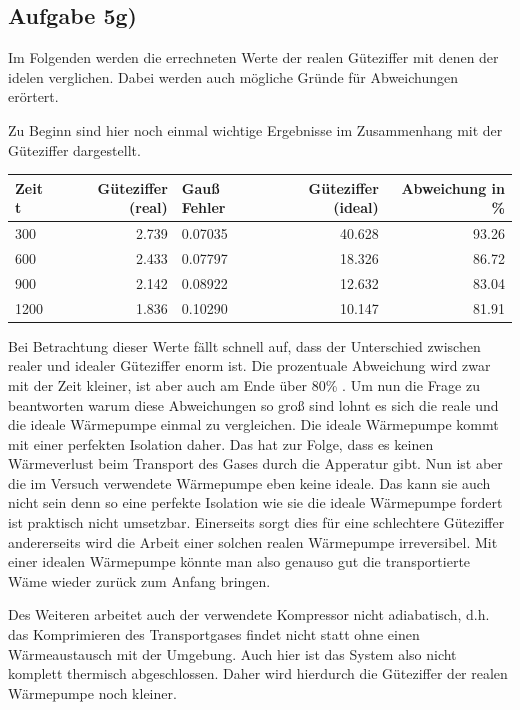 \documentclass[titlepage=firstcover, captions=tableheading]{scrartcl}
\begin{document}
\subsection{Aufgabe 5g)}

Im Folgenden werden die errechneten Werte der realen Güteziffer mit denen der idelen verglichen.
Dabei werden auch mögliche Gründe für Abweichungen erörtert. 

Zu Beginn sind hier noch einmal wichtige Ergebnisse im Zusammenhang mit der Güteziffer dargestellt.
\begin{center}
    \begin{tabular}{lr@{${}\pm{}$}lrr}
        \toprule
        {Zeit t} & { Güteziffer (real)} & {Gauß Fehler} & {Güteziffer (ideal)} & {Abweichung in \%} \\
        \midrule
        300 & 2.739 & 0.07035  & 40.628 & 93.26 \\
        600 & 2.433 & 0.07797  & 18.326 & 86.72 \\
        900 & 2.142 & 0.08922 & 12.632 & 83.04 \\
        1200 & 1.836 & 0.10290 & 10.147 & 81.91\\
        \bottomrule
        
    \end{tabular}
\end{center}

Bei Betrachtung dieser Werte fällt schnell auf, dass der Unterschied zwischen realer und idealer Güteziffer enorm ist.
Die prozentuale Abweichung wird zwar mit der Zeit kleiner, ist aber auch am Ende über 80\% .
Um nun die Frage zu beantworten warum diese Abweichungen so groß sind lohnt es sich die reale und die ideale Wärmepumpe einmal zu vergleichen.
Die ideale Wärmepumpe kommt mit einer perfekten Isolation daher. 
Das hat zur Folge, dass es keinen Wärmeverlust beim Transport des Gases durch die Apperatur gibt.
Nun ist aber die im Versuch verwendete Wärmepumpe eben keine ideale. 
Das kann sie auch nicht sein denn so eine perfekte Isolation wie sie die ideale Wärmepumpe fordert ist praktisch nicht umsetzbar.
Einerseits sorgt dies für eine schlechtere Güteziffer andererseits wird die Arbeit einer solchen realen Wärmepumpe irreversibel.
Mit einer idealen Wärmepumpe könnte man also genauso gut die transportierte Wäme wieder zurück zum Anfang bringen.

Des Weiteren arbeitet auch der verwendete Kompressor nicht adiabatisch, 
d.h. das Komprimieren des Transportgases findet nicht statt ohne einen Wärmeaustausch mit der Umgebung.
Auch hier ist das System also nicht komplett thermisch abgeschlossen.
Daher wird hierdurch die Güteziffer der realen Wärmepumpe noch kleiner.
\end{document}
